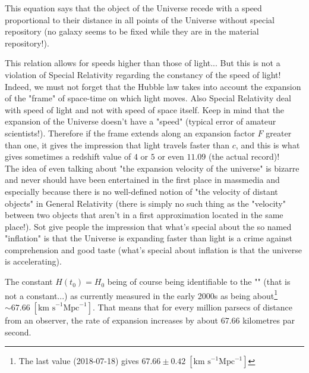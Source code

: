 	This equation says that the object of the Universe recede with a speed proportional to their distance in all points of the Universe without special repository (no galaxy seems to be fixed while they are in the material repository!).
	\begin{tcolorbox}[title=Remark,colframe=black,arc=10pt]
	This relation allows for speeds higher than those of light... But this is not a violation of Special Relativity regarding the constancy of the speed of light! Indeed, we must not forget that the Hubble law takes into account the expansion of the "frame" of space-time on which light moves. Also Special Relativity deal with speed of light and not with speed of space itself. Keep in mind that the expansion of the Universe doesn't have a "speed" (typical error of amateur scientists!). Therefore if the frame extends along an expansion factor $F$ greater than one, it gives the impression that light travels faster than $c$, and this is what gives sometimes a redshift value of $4$ or $5$ or even $11.09$ (the actual record)!\\
	
	The idea of even talking about "the expansion velocity of the universe" is bizarre and never should have been entertained in the first place in massmedia and especially because there is no well-defined notion of "the velocity of distant objects" in General Relativity (there is simply no such thing as the "velocity" between two objects that aren't in a first approximation located in the same place!). Sot give people the impression that what's special about the so named "inflation" is that the Universe is expanding faster than light is a crime against comprehension and good taste (what's special about inflation is that the universe is accelerating).
	\end{tcolorbox}
	

	The constant $H(t_0)=H_0$ being of course being identifiable to the "" (that is not a constant...) as currently measured in the early 2000s as being about\footnote{The last value (2018-07-18) gives $67.66\pm 0.42 \; [\text{km s}^{-1} \text{Mpc}^{-1}]$} $\sim 67.66\; [\text{km s}^{-1} \text{Mpc}^{-1}]$. That means that for every million parsecs of distance from an observer, the rate of expansion increases by about $67.66$ kilometres par second.
	
